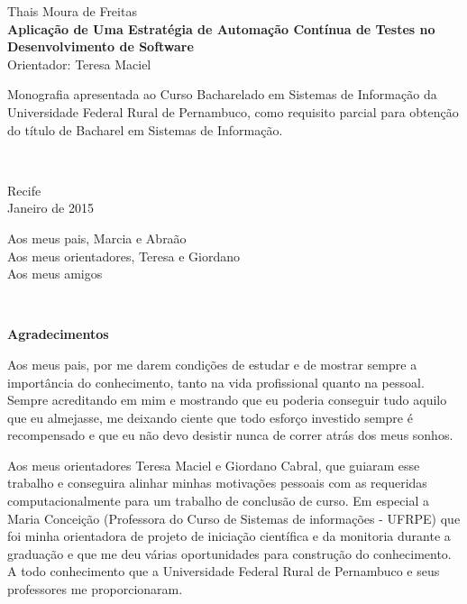 %
\hyphenation{}

\vspace*{0.0cm}
{\center
{\Large Thais Moura de Freitas}\\[2.4cm]
{\huge \bf Aplicação de Uma Estratégia de Automação Contínua de Testes no Desenvolvimento de Software}\\[2.0cm]
{\Large Orientador: Teresa Maciel}}\\[2.0cm]


{\raggedleft
\begin{minipage}[t]{8.3cm}
\setlength{\baselineskip}{0.25in}
Monografia apresentada ao Curso Bacharelado em Sistemas de Informação  da Universidade Federal Rural de Pernambuco, como requisito parcial para obtenção do título de Bacharel em Sistemas de Informação.\end{minipage}\\[2cm]}
\vspace{3cm}
{\center Recife \\[3mm]
Janeiro de 2015 \\}

\newpage
\vspace*{18cm}
{\raggedleft
\begin{minipage}[t]{6.0cm}
\setlength{\baselineskip}{0.25in}
Aos meus pais, Marcia e Abraão\\
Aos meus orientadores, Teresa e Giordano\\
Aos meus amigos\\
\end{minipage}\\[2cm]}

\newpage
\begin{center}
{\Large \bf Agradecimentos}
\end{center}
\vspace*{-0.06in}

Aos meus pais, por me darem condições de estudar e de mostrar sempre a importância do conhecimento, tanto na vida profissional quanto na pessoal. Sempre acreditando em mim e mostrando que eu poderia conseguir tudo aquilo que eu almejasse, me deixando ciente que todo esforço investido sempre é recompensado e que eu não devo desistir nunca de correr atrás dos meus sonhos. 

Aos meus orientadores Teresa Maciel e Giordano Cabral, que guiaram esse trabalho e conseguira alinhar minhas motivações pessoais com as requeridas computacionalmente para um trabalho de conclusão de curso. Em especial a Maria Conceição (Professora do Curso de Sistemas de informações - UFRPE) que foi minha orientadora de projeto de iniciação científica e da monitoria durante a graduação e que me deu várias oportunidades para construção do conhecimento. A todo conhecimento que a Universidade Federal Rural de Pernambuco e seus professores me proporcionaram. 

